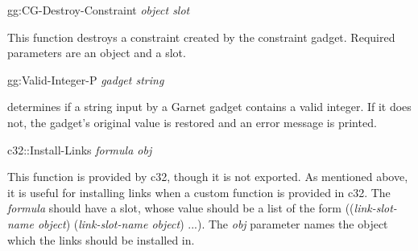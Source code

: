 \begin{group}
\begin{programexample}
gg:CG-Destroy-Constraint {\it object  slot} \value{function}
\end{programexample}

This function destroys a constraint created by the
constraint gadget. Required parameters are an object
and a slot.

\end{group}

% 
% 
% 
% 
\begin{group}
\begin{programexample}
gg:Valid-Integer-P {\it gadget string} \value{function}
\end{programexample}

 determines if a string input by a Garnet gadget contains
a valid integer. If it does not, the gadget's original value
is restored and an error message is printed.

\end{group}


\vspace{1 line}
\begin{group}
\begin{programexample}
c32::Install-Links {\it formula  obj} \value{function}
\end{programexample}

This function is provided by c32, though it is not exported.  As mentioned
above, it is useful for installing links when a custom function is provided
in c32.  The {\it formula} should have a  slot, whose value
should be a list of the form
(({\it link-slot-name  object}) ({\it link-slot-name object}) ...).
The {\it obj} parameter names the object which the links should be installed
in.
\end{group}


